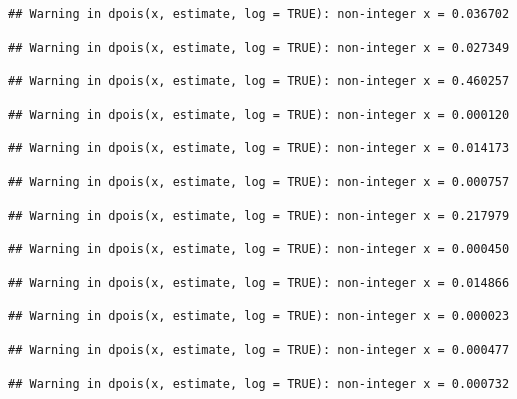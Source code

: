 \documentclass[]{article}
\begin{document}
\begin{verbatim}
## Warning in dpois(x, estimate, log = TRUE): non-integer x = 0.036702
\end{verbatim}

\begin{verbatim}
## Warning in dpois(x, estimate, log = TRUE): non-integer x = 0.027349
\end{verbatim}

\begin{verbatim}
## Warning in dpois(x, estimate, log = TRUE): non-integer x = 0.460257
\end{verbatim}

\begin{verbatim}
## Warning in dpois(x, estimate, log = TRUE): non-integer x = 0.000120
\end{verbatim}

\begin{verbatim}
## Warning in dpois(x, estimate, log = TRUE): non-integer x = 0.014173
\end{verbatim}

\begin{verbatim}
## Warning in dpois(x, estimate, log = TRUE): non-integer x = 0.000757
\end{verbatim}

\begin{verbatim}
## Warning in dpois(x, estimate, log = TRUE): non-integer x = 0.217979
\end{verbatim}

\begin{verbatim}
## Warning in dpois(x, estimate, log = TRUE): non-integer x = 0.000450
\end{verbatim}

\begin{verbatim}
## Warning in dpois(x, estimate, log = TRUE): non-integer x = 0.014866
\end{verbatim}

\begin{verbatim}
## Warning in dpois(x, estimate, log = TRUE): non-integer x = 0.000023
\end{verbatim}

\begin{verbatim}
## Warning in dpois(x, estimate, log = TRUE): non-integer x = 0.000477
\end{verbatim}

\begin{verbatim}
## Warning in dpois(x, estimate, log = TRUE): non-integer x = 0.000732
\end{verbatim}
\end{document}

